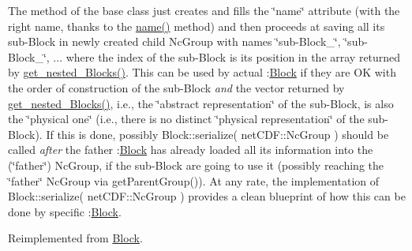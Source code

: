 The method of the base class just creates and fills the \char`\"{}name\char`\"{} attribute (with the right name, thanks to the \mbox{\hyperlink{class_s_m_spp__di__unipi__it_1_1_block_a738e9dfd6e00507da219e4bd5a3f6be9}{name()}} method) and then proceeds at saving all its sub-\/\+Block in newly created child Nc\+Group with names \char`\"{}sub-\/\+Block\+\_\char`\"{}, \char`\"{}sub-\/\+Block\+\_\char`\"{}, ... where the index of the sub-\/\+Block is its position in the array returned by \mbox{\hyperlink{class_s_m_spp__di__unipi__it_1_1_block_a39bc932e28075740f08b392830a67e03}{get\+\_\+nested\+\_\+\+Blocks()}}. This can be used by actual \+:\mbox{\hyperlink{class_s_m_spp__di__unipi__it_1_1_block}{Block}} if they are OK with the order of construction of the sub-\/\+Block {\itshape and} the vector returned by \mbox{\hyperlink{class_s_m_spp__di__unipi__it_1_1_block_a39bc932e28075740f08b392830a67e03}{get\+\_\+nested\+\_\+\+Blocks()}}, i.\+e., the \char`\"{}abstract representation\char`\"{} of the sub-\/\+Block, is also the \char`\"{}physical one\char`\"{} (i.\+e., there is no distinct \char`\"{}physical representation\char`\"{} of the sub-\/\+Block). If this is done, possibly Block\+::serialize( net\+C\+D\+F\+::\+Nc\+Group ) should be called {\itshape after} the father \+:\mbox{\hyperlink{class_s_m_spp__di__unipi__it_1_1_block}{Block}} has already loaded all its information into the (\char`\"{}father\char`\"{}) Nc\+Group, if the sub-\/\+Block are going to use it (possibly reaching the \char`\"{}father\char`\"{} Nc\+Group via get\+Parent\+Group()). At any rate, the implementation of Block\+::serialize( net\+C\+D\+F\+::\+Nc\+Group ) provides a clean blueprint of how this can be done by specific \+:\mbox{\hyperlink{class_s_m_spp__di__unipi__it_1_1_block}{Block}}. 

Reimplemented from \mbox{\hyperlink{class_s_m_spp__di__unipi__it_1_1_block_a59f3f59d72c56028f06c555bdcd36caf}{Block}}.

\mbox{\label{class_s_m_spp__di__unipi__it_1_1_m_c_f_block_adcf617da871dbcb03625164002da6b89}} 
